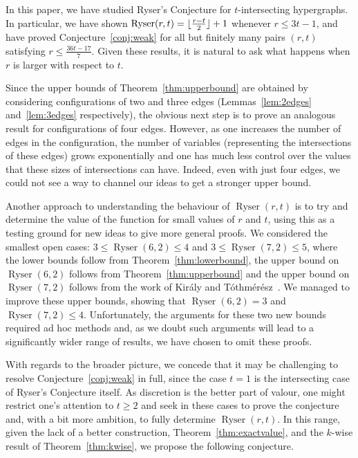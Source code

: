 \documentclass[a4paper,twoside,11pt]{article}
\DeclarePairedDelimiter{\floor}{\lfloor}{\rfloor}
\numberwithin{thm}{section}
\theoremstyle{definition}
\theoremstyle{remark}
\theoremstyle{definition}
\DeclareMathOperator{\Ryser}{Ryser}
\begin{document}
In this paper, we have studied Ryser's Conjecture for $t$-intersecting hypergraphs.  In particular, we have shown $\Ryser(r,t) = \floor{\frac{r-t}{2}} + 1$ whenever $r \le 3t - 1$, and have proved Conjecture~\ref{conj:weak} for all but finitely many pairs $(r,t)$ satisfying $r \le \frac{36t - 17}{7}$.  Given these results, it is natural to ask what happens when $r$ is larger with respect to $t$.

Since the upper bounds of Theorem~\ref{thm:upperbound} are obtained by considering configurations of two and three edges (Lemmas~\ref{lem:2edges} and~\ref{lem:3edges} respectively), the obvious next step is to prove an analogous result for configurations of four edges. However, as one increases the number of edges in the configuration, the number of variables (representing the intersections of these edges) grows exponentially and one has much less control over the values that these sizes of intersections can have. Indeed, even with just four edges, we could not see a way to channel our ideas to get a stronger upper bound.

Another approach to understanding the behaviour of $\Ryser(r,t)$ is to try and determine the value of the function for small values of $r$ and $t$, using this as a testing ground for new ideas to give more general proofs. We considered the smallest open cases: $3 \le \Ryser(6,2) \le 4$ and $ 3\le \Ryser(7,2) \le 5$, where the lower bounds follow from Theorem~\ref{thm:lowerbound}, the upper bound on $\Ryser(6,2)$ follows from Theorem~\ref{thm:upperbound}  and the upper bound on $\Ryser(7,2)$ follows from the work of  Kir\'aly and T\'othm\'er\'esz~\cite{kirtot}. We managed to improve these upper bounds, showing that $\Ryser(6,2)=3$ and $\Ryser(7,2)\le 4$. Unfortunately, the arguments for these two new bounds required ad hoc methods and, as we doubt such arguments will lead to a significantly wider range of results, we have chosen to omit these proofs.

With regards to the broader picture, we concede that it may be challenging to resolve Conjecture~\ref{conj:weak} in full, since the case $t = 1$ is the intersecting case of Ryser's Conjecture itself.  As discretion is the better part of valour, one might restrict one's attention to $t \ge 2$ and seek in these cases to prove the conjecture and, with a bit more ambition, to fully determine $\Ryser(r,t)$.  In this range, given the lack of a better construction, Theorem~\ref{thm:exactvalue}, and the $k$-wise result of Theorem~\ref{thm:kwise}, we propose the following conjecture.
\end{document}

